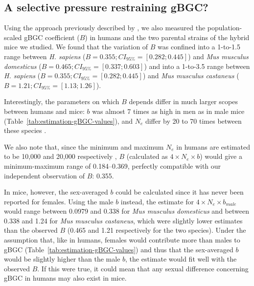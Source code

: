 \subsection{A selective pressure restraining gBGC?}




Using the approach previously described by \citet{glemin2015quantification}, we also measured the population-scaled gBGC coefficient ($B$) in humans and the two parental strains of the hybrid mice we studied.
We found that the variation of $B$ was confined into a 1-to-1.5 range between \textit{H. sapiens} ($B = 0.355; CI_{95\%} = [0.282; 0.445]$) and \textit{Mus musculus domesticus} ($B = 0.465; CI_{95\%} = [0.337; 0.603]$) and into a 1-to-3.5 range between \textit{H. sapiens} ($B = 0.355; CI_{95\%} = [0.282; 0.445]$) and \textit{Mus musculus castaneus} ($B = 1.21; CI_{95\%} = [1.13; 1.26]$).

Interestingly, the parameters on which $B$ depends differ in much larger scopes between humans and mice: $b$ was almost 7 times as high in men as in male mice (Table~\ref{tab:estimation-gBGC-values}), and $N_e$ differ by 20 to 70 times between these species \citep{charlesworth2009fundamental,phifer-rixey2012adaptive}.

We also note that, since the minimum and maximum $N_e$ in humans are estimated to be 10,000 and 20,000 respectively \citep{charlesworth2009fundamental}, $B$ (calculated as $4 \times N_e \times b$) would give a minimum-maximum range of 0.184--0.369, perfectly compatible with our independent observation of $B$: 0.355.

In mice, however, the sex-averaged $b$ could be calculated since it has never been reported for females.
Using the male $b$ instead, the estimate for $4 \times N_e \times b_{male}$ would range between 0.0979 and 0.338 for \textit{Mus musculus domesticus} and between 0.338 and 1.24 for \textit{Mus musculus castaneus}, which were slightly lower estimates than the observed $B$ (0.465 and 1.21 respectively for the two species).
Under the assumption that, like in humans, females would contribute more than males to gBGC (Table~\ref{tab:estimation-gBGC-values}) and thus that the sex-averaged $b$ would be slightly higher than the male $b$, the estimate would fit well with the observed $B$. If this were true, it could mean that any sexual difference concerning gBGC in humans may also exist in mice.\\



